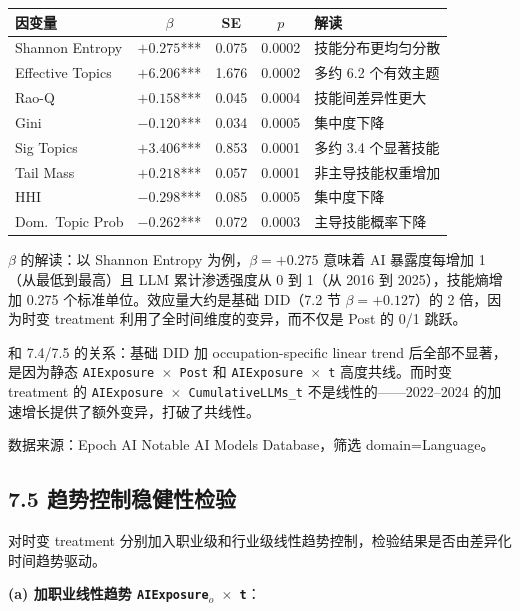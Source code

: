 \documentclass[12pt,a4paper]{article}
\begin{document}
\begin{exambox}
\begin{center}
\small
\begin{tabular}{lcccp{4.5cm}}
\toprule
因变量 & $\beta$ & SE & $p$ & 解读 \\
\midrule
Shannon Entropy & $+0.275$*** & 0.075 & 0.0002 & 技能分布更均匀分散 \\
Effective Topics & $+6.206$*** & 1.676 & 0.0002 & 多约 6.2 个有效主题 \\
Rao-Q & $+0.158$*** & 0.045 & 0.0004 & 技能间差异性更大 \\
Gini & $-0.120$*** & 0.034 & 0.0005 & 集中度下降 \\
Sig Topics & $+3.406$*** & 0.853 & 0.0001 & 多约 3.4 个显著技能 \\
Tail Mass & $+0.218$*** & 0.057 & 0.0001 & 非主导技能权重增加 \\
HHI & $-0.298$*** & 0.085 & 0.0005 & 集中度下降 \\
Dom.\ Topic Prob & $-0.262$*** & 0.072 & 0.0003 & 主导技能概率下降 \\
\bottomrule
\end{tabular}
\end{center}

$\beta$ 的解读：以 Shannon Entropy 为例，$\beta=+0.275$ 意味着 AI 暴露度每增加 1（从最低到最高）且 LLM 累计渗透强度从 0 到 1（从 2016 到 2025），技能熵增加 0.275 个标准单位。效应量大约是基础 DID（7.2 节 $\beta=+0.127$）的 2 倍，因为时变 treatment 利用了全时间维度的变异，而不仅是 Post 的 0/1 跳跃。

和 7.4/7.5 的关系：基础 DID 加 occupation-specific linear trend 后全部不显著，是因为静态 \texttt{AIExposure $\times$ Post} 和 \texttt{AIExposure $\times$ t} 高度共线。而时变 treatment 的 \texttt{AIExposure $\times$ CumulativeLLMs\_t} 不是线性的——2022--2024 的加速增长提供了额外变异，打破了共线性。

数据来源：Epoch AI Notable AI Models Database，筛选 domain=Language。
\end{exambox}

\subsection*{7.5 趋势控制稳健性检验}

对时变 treatment 分别加入职业级和行业级线性趋势控制，检验结果是否由差异化时间趋势驱动。

\medskip
\textbf{(a) 加职业线性趋势 \texttt{AIExposure$_o$ $\times$ t}}：
\end{document}
